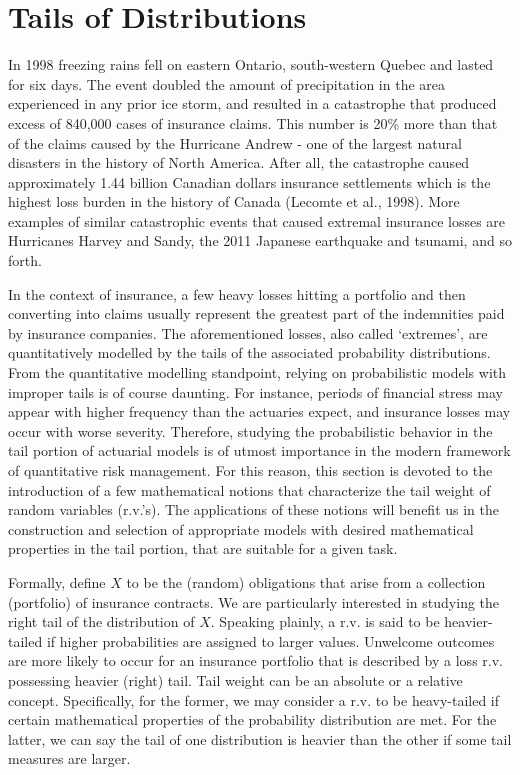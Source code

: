 \documentclass[]{book}
\theoremstyle{definition}
\theoremstyle{definition}
\theoremstyle{definition}
\theoremstyle{remark}
\begin{document}
\section{Tails of Distributions}\label{tails-of-distributions}

In 1998 freezing rains fell on eastern Ontario, south-western Quebec and
lasted for six days. The event doubled the amount of precipitation in
the area experienced in any prior ice storm, and resulted in a
catastrophe that produced excess of 840,000 cases of insurance claims.
This number is 20\% more than that of the claims caused by the Hurricane
Andrew - one of the largest natural disasters in the history of North
America. After all, the catastrophe caused approximately 1.44 billion
Canadian dollars insurance settlements which is the highest loss burden
in the history of Canada (Lecomte et al., 1998). More examples of
similar catastrophic events that caused extremal insurance losses are
Hurricanes Harvey and Sandy, the 2011 Japanese earthquake and tsunami,
and so forth.

In the context of insurance, a few heavy losses hitting a portfolio and
then converting into claims usually represent the greatest part of the
indemnities paid by insurance companies. The aforementioned losses, also
called `extremes', are quantitatively modelled by the tails of the
associated probability distributions. From the quantitative modelling
standpoint, relying on probabilistic models with improper tails is of
course daunting. For instance, periods of financial stress may appear
with higher frequency than the actuaries expect, and insurance losses
may occur with worse severity. Therefore, studying the probabilistic
behavior in the tail portion of actuarial models is of utmost importance
in the modern framework of quantitative risk management. For this
reason, this section is devoted to the introduction of a few
mathematical notions that characterize the tail weight of random
variables (r.v.'s). The applications of these notions will benefit us in
the construction and selection of appropriate models with desired
mathematical properties in the tail portion, that are suitable for a
given task.

Formally, define \(X\) to be the (random) obligations that arise from a
collection (portfolio) of insurance contracts. We are particularly
interested in studying the right tail of the distribution of \(X\).
Speaking plainly, a r.v. is said to be heavier-tailed if higher
probabilities are assigned to larger values. Unwelcome outcomes are more
likely to occur for an insurance portfolio that is described by a loss
r.v. possessing heavier (right) tail. Tail weight can be an absolute or
a relative concept. Specifically, for the former, we may consider a r.v.
to be heavy-tailed if certain mathematical properties of the probability
distribution are met. For the latter, we can say the tail of one
distribution is heavier than the other if some tail measures are larger.
\end{document}
